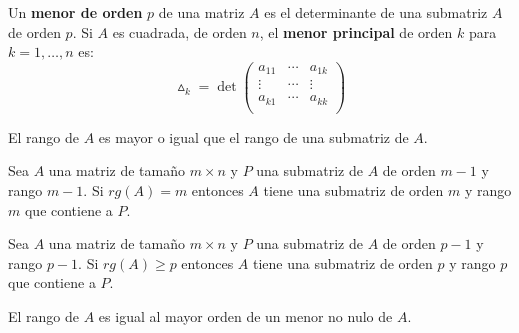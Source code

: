 Un \textbf{menor de orden} $p$ de una matriz $A$ es el determinante de una submatriz $A$ de orden $p$. Si $A$ es cuadrada, de orden $n$, el \textbf{menor principal} de orden $k$ para $k=1,\ldots,n$ es:
\[
\vartriangle_k=\det\begin{pmatrix}
a_{11} & \cdots & a_{1k} \\
\vdots & \cdots & \vdots \\
a_{k1} & \cdots & a_{kk} \\
\end{pmatrix}
\]

El rango de $A$ es mayor o igual que el rango de una submatriz de $A$.

Sea $A$ una matriz de tamaño $m \times n$ y $P$ una submatriz de $A$ de orden $m-1$ y rango $m-1$. Si $rg(A)=m$ entonces $A$ tiene una submatriz de orden $m$ y rango $m$ que contiene a $P$.

Sea $A$ una matriz de tamaño $m \times n$ y $P$ una submatriz de $A$ de orden $p-1$ y rango $p-1$. Si $rg(A) \geq p$ entonces $A$ tiene una submatriz de orden $p$ y rango $p$ que contiene a $P$.

El rango de $A$ es igual al mayor orden de un menor no nulo de $A$.